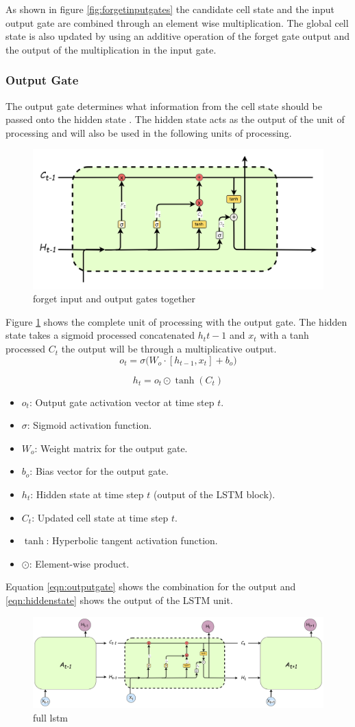 As shown in figure \ref{fig:forgetinputgates} the candidate cell state and the input output gate are combined through an element wise multiplication. The global cell state is also updated by using an additive operation of the forget gate output and the output of the multiplication in the input gate.
 \subsubsection{Output Gate}
The output gate determines what information from the cell state should be passed onto the hidden state \cite{zhu2025novel}. The hidden state acts as the output of the unit of processing and will also be used in the following units of processing.
 \begin{figure}[h]
 	\centering
 	\includegraphics[width=0.5\linewidth]{Chapters/images/forget_input_output_gates1}
 	\caption{forget input and output gates together}
 	\label{fig:forgetinputoutputgates1}
 \end{figure}
 Figure \ref{fig:forgetinputoutputgates1} shows the complete unit of processing with the output gate. The hidden state takes a sigmoid processed concatenated $h_t{t-1}$ and $x_t$ with a tanh processed $C_t$ the output will be through a multiplicative output. 
 \[
 o_t = \sigma \Big( W_o \cdot [h_{t-1}, x_t] + b_o \Big)
 \tag{21}
 \label{eqn:outputgate}
 \]
 
 \[
 h_t = o_t \odot \tanh(C_t)
 \tag{22}
 \label{eqn:hiddenstate}
 \]
 \begin{itemize}
 	\item $o_t$: Output gate activation vector at time step $t$.
 	\item $\sigma$: Sigmoid activation function.
 	\item $W_o$: Weight matrix for the output gate.
 
 	\item $b_o$: Bias vector for the output gate.
 	\item $h_t$: Hidden state at time step $t$ (output of the LSTM block).
 	\item $C_t$: Updated cell state at time step $t$.
 	\item $\tanh$: Hyperbolic tangent activation function.
 	\item $\odot$: Element-wise product.
 \end{itemize}
  Equation \ref{eqn:outputgate}  shows the combination for the output and \ref{eqn:hiddenstate} shows the output of the LSTM unit.
  
  
 \begin{figure}[h]
 	\centering
 	\includegraphics[width=0.7\linewidth]{"Chapters/images/full lstm"}
 	\caption{full lstm}
 	\label{fig:full-lstm}
 \end{figure}
 